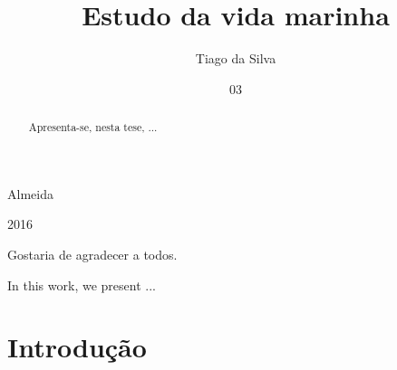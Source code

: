 \documentclass[tcc2]{uftex}
\begin{document}
  \title{Estudo da vida marinha}
  \author{Tiago da Silva}{Almeida}
  

  \date{03}{2016}



  \maketitle

  \frontmatter
  \dedication{A algu\'em cujo valor \'e digno desta dedicat\'oria.}

  \begin{acknowledgement}
  Gostaria de agradecer a todos.
  \end{acknowledgement}

  \begin{abstract}
  Apresenta-se, nesta tese, ...
  \end{abstract}

  \begin{foreignabstract}
  In this work, we present ...
  \end{foreignabstract}


\printlosymbols  
\printloabbreviations
\listoffigures            
\listoftables 
\tableofcontents 

\mainmatter
\onehalfspacing
\chapter{Introdução}
\label{cap:introducao}
\end{document}
